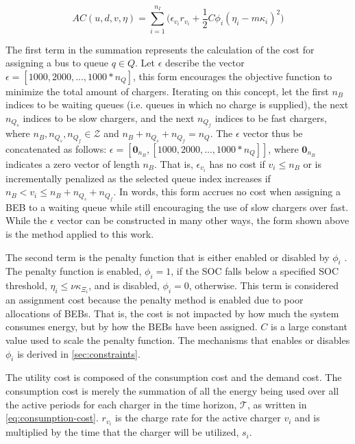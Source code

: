 \documentclass[11pt,a4paper,final]{article}
\newcommand{\T}{\mathcal{T}}                %
\newcommand{\AC}{AC(u, d, v, \eta)}         %
\begin{document}
\begin{equation}
\label{eq:ac}
\AC = \sum_{i=1}^{n_I} \Big(\epsilon_{v_i}r_{v_i} + \frac{1}{2} C \phi_i (\eta_i - m \kappa_i)^{2}\Big)
\end{equation}

The first term in the summation represents the calculation of the cost for assigning a bus to queue \(q \in Q\). Let \(\epsilon\)
describe the vector \(\epsilon = [1000, 2000, ..., 1000*n_Q]\), this form encourages the objective function to minimize the total
amount of chargers. Iterating on this concept, let the first \(n_B\) indices to be waiting queues (i.e. queues in which no
charge is supplied), the next \(n_{Q_s}\) indices to be slow chargers, and the next \(n_{Q_f}\) indices to be fast chargers,
where \(n_B, n_{Q_s}, n_{Q_f} \in \mathcal{Z}\) and \(n_B + n_{Q_s} + n_{Q_f} = n_Q\). The \(\epsilon\) vector thus be concatenated as follows:
\(\epsilon = [\mathbf{0}_{n_B}, [1000, 2000, ..., 1000*n_Q]]\), where \(\mathbf{0}_{n_B}\) indicates a zero vector of length \(n_B\).
That is, \(\epsilon_{v_i}\) has no cost if \(v_i \le n_B\) or is incrementally penalized as the selected queue index increases if
\(n_B < v_i \le n_B + n_{Q_s} + n_{Q_f}\). In words, this form accrues no cost when assigning a BEB to a waiting queue while
still encouraging the use of slow chargers over fast. While the \(\epsilon\) vector can be constructed in many other ways, the
form shown above is the method applied to this work.

The second term is the penalty function that is either enabled or disabled by \(\phi_i\)
\cite{luenberger-2008-penal-barrier-method}. The penalty function is enabled, \(\phi_i = 1\), if the SOC falls below a
specified SOC threshold, \(\eta_i \le \nu \kappa_{\Xi_i}\), and is disabled, \(\phi_i = 0\), otherwise. This term is considered an assignment
cost because the penalty method is enabled due to poor allocations of BEBs. That is, the cost is not impacted by how
much the system consumes energy, but by how the BEBs have been assigned. \(C\) is a large constant value used to scale the
penalty function. The mechanisms that enables or disables \(\phi_i\) is derived in \ref{sec:constraints}.

The utility cost is composed of the consumption cost and the demand cost. The consumption cost is merely the summation
of all the energy being used over all the active periods for each charger in the time horizon, \(\T\), as written in
\ref{eq:consumption-cost}. \(r_{v_i}\) is the charge rate for the active charger \(v_i\) and is multiplied by the time that the
charger will be utilized, \(s_i\).
\end{document}
